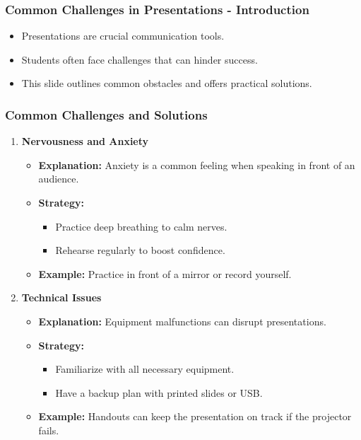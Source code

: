 \documentclass[aspectratio=169]{beamer}
\begin{document}
\begin{frame}[fragile]
    \frametitle{Common Challenges in Presentations - Introduction}
    \begin{itemize}
        \item Presentations are crucial communication tools.
        \item Students often face challenges that can hinder success.
        \item This slide outlines common obstacles and offers practical solutions.
    \end{itemize}
\end{frame}

\begin{frame}[fragile]
    \frametitle{Common Challenges and Solutions}
    \begin{enumerate}
        \item \textbf{Nervousness and Anxiety}
            \begin{itemize}
                \item \textbf{Explanation:} Anxiety is a common feeling when speaking in front of an audience.
                \item \textbf{Strategy:}
                    \begin{itemize}
                        \item Practice deep breathing to calm nerves.
                        \item Rehearse regularly to boost confidence.
                    \end{itemize}
                \item \textbf{Example:} Practice in front of a mirror or record yourself.
            \end{itemize}
        
        \item \textbf{Technical Issues}
            \begin{itemize}
                \item \textbf{Explanation:} Equipment malfunctions can disrupt presentations.
                \item \textbf{Strategy:}
                    \begin{itemize}
                        \item Familiarize with all necessary equipment.
                        \item Have a backup plan with printed slides or USB.
                    \end{itemize}
                \item \textbf{Example:} Handouts can keep the presentation on track if the projector fails.
            \end{itemize}
        

\end{enumerate}
\end{frame}
\end{document}
